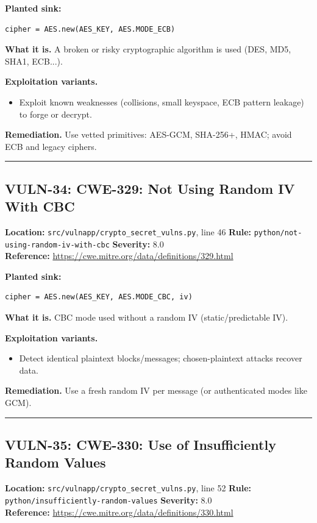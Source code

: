 \documentclass[11pt,a4paper]{article}
\begin{document}
\noindent\textbf{Planted sink:}
\begin{lstlisting}
cipher = AES.new(AES_KEY, AES.MODE_ECB)
\end{lstlisting}
\noindent\textbf{What it is.} A broken or risky cryptographic algorithm is used (DES, MD5, SHA1, ECB...).

\noindent\textbf{Exploitation variants.}
\begin{itemize}[leftmargin=1.4em,itemsep=1pt,topsep=2pt]
\item Exploit known weaknesses (collisions, small keyspace, ECB pattern leakage) to forge or decrypt.
\end{itemize}
\noindent\textbf{Remediation.} Use vetted primitives: AES-GCM, SHA-256+, HMAC; avoid ECB and legacy ciphers.

\vspace{4pt}\hrule\vspace{6pt}
\subsection{VULN-34: CWE-329: Not Using Random IV With CBC}
\noindent\textbf{Location:} \texttt{src/vulnapp/crypto\_secret\_vulns.py}, line 46 \quad \textbf{Rule:} \texttt{python/not-using-random-iv-with-cbc} \quad \textbf{Severity:} 8.0
\\ \textbf{Reference:} \url{https://cwe.mitre.org/data/definitions/329.html}

\noindent\textbf{Planted sink:}
\begin{lstlisting}
cipher = AES.new(AES_KEY, AES.MODE_CBC, iv)
\end{lstlisting}
\noindent\textbf{What it is.} CBC mode used without a random IV (static/predictable IV).

\noindent\textbf{Exploitation variants.}
\begin{itemize}[leftmargin=1.4em,itemsep=1pt,topsep=2pt]
\item Detect identical plaintext blocks/messages; chosen-plaintext attacks recover data.
\end{itemize}
\noindent\textbf{Remediation.} Use a fresh random IV per message (or authenticated modes like GCM).

\vspace{4pt}\hrule\vspace{6pt}
\subsection{VULN-35: CWE-330: Use of Insufficiently Random Values}
\noindent\textbf{Location:} \texttt{src/vulnapp/crypto\_secret\_vulns.py}, line 52 \quad \textbf{Rule:} \texttt{python/insufficiently-random-values} \quad \textbf{Severity:} 8.0
\\ \textbf{Reference:} \url{https://cwe.mitre.org/data/definitions/330.html}
\end{document}
